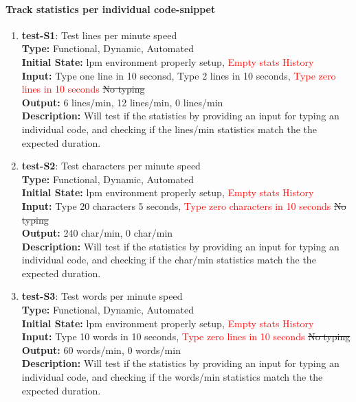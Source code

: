 \documentclass[12pt, titlepage]{article}
\begin{document}
\paragraph{Track statistics per individual code-snippet}
\begin{enumerate}
\item{\textbf{test-S1}: Test lines per minute speed\\}
\textbf{Type:} Functional, Dynamic, Automated \\
\textbf{Initial State:} lpm environment properly setup, \textcolor{red}{Empty stats History}\\
\textbf{Input:} Type one line in 10 seconsd, Type 2 lines in 10 seconds, \textcolor{red}{Type zero lines in 10 seconds} \sout{No typing}\\
\textbf{Output:} 6 lines/min, 12 lines/min, 0 lines/min \\
\textbf{Description:} Will test if the statistics by providing an input for typing an individual code, and checking if the lines/min statistics match the the expected duration.\\

\item{\textbf{test-S2}: Test characters per minute speed \\}
\textbf{Type:} Functional, Dynamic, Automated \\
\textbf{Initial State:} lpm environment properly setup, \textcolor{red}{Empty stats History}\\
\textbf{Input:} Type 20 characters 5 seconds, \textcolor{red}{Type zero characters in 10 seconds} \sout{No typing}\\
\textbf{Output:} 240 char/min, 0 char/min \\
\textbf{Description:} Will test if the statistics by providing an input for typing an individual code, and checking if the char/min statistics match the the expected duration.\\

\item{\textbf{test-S3}: Test words per minute speed\\}
\textbf{Type:} Functional, Dynamic, Automated \\
\textbf{Initial State:} lpm environment properly setup, \textcolor{red}{Empty stats History}\\
\textbf{Input:} Type 10 words in 10 seconds, \textcolor{red}{Type zero lines in 10 seconds} \sout{No typing}\\
\textbf{Output:} 60 words/min, 0 words/min \\
\textbf{Description:} Will test if the statistics by providing an input for typing an individual code, and checking if the words/min statistics match the the expected duration.\\


\end{enumerate}
\end{document}
